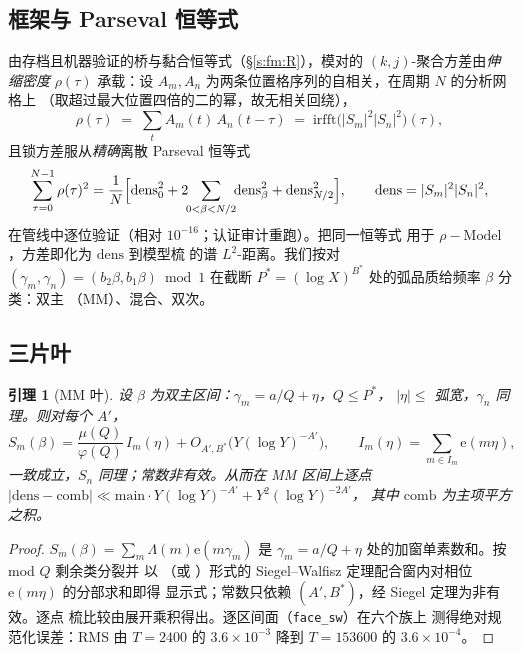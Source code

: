 \documentclass[11pt]{article}
\numberwithin{equation}{section}
\newtheorem{lemma}[theorem]{引理}
\theoremstyle{definition}
\theoremstyle{remark}
\newcommand{\LL}{\Lambda}
\newcommand{\e}{\mathrm{e}}
\begin{document}
\subsection{框架与 Parseval 恒等式}

由存档且机器验证的桥与黏合恒等式（\S\ref{s:fm:R}），模对的
$(k,j)$-聚合方差由\emph{伸缩密度} $\rho(\tau)$ 承载：设
$A_m,A_n$ 为两条位置格序列的自相关，在周期 $N$ 的分析网格上
（取超过最大位置四倍的二的幂，故无相关回绕），
\[
\rho(\tau)\;=\;\sum_{t}A_m(t)\,A_n(t-\tau)
\;=\;\mathrm{irfft}\bigl(|S_m|^{2}|S_n|^{2}\bigr)(\tau),
\]
且锁方差服从\emph{精确}离散 Parseval 恒等式
\begin{equation}\label{e:pars}
\sum_{\tau=0}^{N-1}\rho(\tau)^{2}
=\frac1N\Bigl[\mathrm{dens}_0^{2}
+2\!\!\sum_{0<\beta<N/2}\!\!\mathrm{dens}_\beta^{2}
+\mathrm{dens}_{N/2}^{2}\Bigr],
\qquad \mathrm{dens}=|S_m|^{2}|S_n|^{2},
\end{equation}
在管线中逐位验证（相对 $10^{-16}$；认证审计重跑）。把同一恒等式
用于 $\rho-\mathrm{Model}$，方差即化为 $\mathrm{dens}$ 到模型梳
的谱 $L^{2}$-距离。我们按对
$(\gamma_m,\gamma_n)=(b_2\beta,b_1\beta)\bmod1$ 在截断
$P^{*}=(\log X)^{B^{*}}$ 处的弧品质给频率 $\beta$ 分类：双主
（MM）、混合、双次。

\subsection{三片叶}

\begin{lemma}[MM 叶]\label{l:MM}
设 $\beta$ 为双主区间：$\gamma_m=a/Q+\eta$，$Q\le P^{*}$，
$|\eta|\le$ 弧宽，$\gamma_n$ 同理。则对每个 $A'$，
\[
S_m(\beta)=\frac{\mu(Q)}{\varphi(Q)}\,I_m(\eta)
+O_{A',B^{*}}\!\bigl(Y(\log Y)^{-A'}\bigr),
\qquad
I_m(\eta)=\sum_{m\in I_m}\e(m\eta),
\]
一致成立，$S_n$ 同理；常数非有效。从而在 MM 区间上逐点
$\bigl|\mathrm{dens}-\mathrm{comb}\bigr|
\ll\mathrm{main}\cdot Y(\log Y)^{-A'}+Y^{2}(\log Y)^{-2A'}$，
其中 $\mathrm{comb}$ 为主项平方之积。
\end{lemma}

\begin{proof}
$S_m(\beta)=\sum_m\LL(m)\e(m\gamma_m)$ 是
$\gamma_m=a/Q+\eta$ 处的加窗单素数和。按 mod $Q$ 剩余类分裂并
以 \cite[\S22]{Dav}（或 \cite[推论~5.29]{IK}）形式的
Siegel--Walfisz 定理配合窗内对相位 $\e(m\eta)$ 的分部求和即得
显示式；常数只依赖 $(A',B^{*})$，经 Siegel 定理为非有效。逐点
梳比较由展开乘积得出。逐区间面（\texttt{face\_sw}）在六个族上
测得绝对规范化误差：RMS 由 $T=2400$ 的 $3.6\times10^{-3}$ 降到
$T=153600$ 的 $3.6\times10^{-4}$。
\end{proof}
\end{document}
